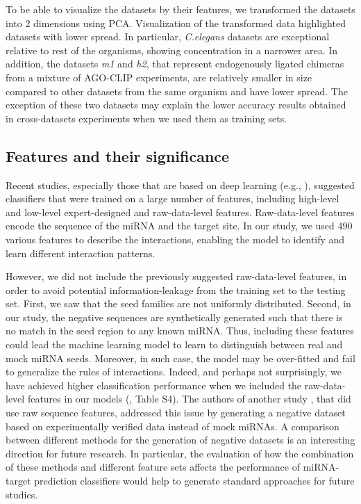 \documentclass{bmcart}
\begin{document}
To be able to visualize the datasets by their features, we transformed the datasets into 2 dimensions using PCA. Visualization of the transformed data highlighted datasets with lower spread. In particular, \textit{C.elegans} datasets are exceptional relative to rest of the organisms, showing concentration in a narrower area. In addition, the datasets \textit{m1} and \textit{h2}, that represent endogenously ligated chimeras from a mixture of AGO-CLIP experiments, are relatively smaller in size compared to other datasets from the same organism and have lower spread. The exception of these two datasets may explain the lower accuracy results obtained in cross-datasets experiments  when we used them as training sets.

\subsection*{Features and their significance}
Recent studies, especially those that are based on deep learning (e.g., \cite{wen2018deepmirtar}), suggested classifiers that were trained on a large number of features, including high-level and low-level expert-designed and raw-data-level features. Raw-data-level features encode the sequence of the miRNA and the target site. In our study, we used 490 various features to describe the interactions, enabling the model to identify and learn different interaction patterns. 

However, we did not include the previously suggested raw-data-level features, in order to avoid potential information-leakage from the training set to the testing set. First, we saw that the seed families are not uniformly distributed. Second, in our study, the negative sequences are synthetically generated such that there is no match in the seed region to any known miRNA. Thus, including these features could lead the machine learning model to learn to distinguish between real and mock miRNA seeds.  Moreover, in such case, the model may be over-fitted and fail to generalize the rules of interactions. Indeed, and perhaps not surprisingly, we have achieved higher classification performance when we included the raw-data-level features in our models (, Table S4). The authors of another study \cite{pla2018miraw}, that did use raw sequence features, addressed this issue by generating a negative dataset based on experimentally verified data instead of mock miRNAs. A comparison between different methods for the generation of negative datasets is an interesting direction for future research. In particular, the evaluation of how the combination of these methods and different feature sets affects the performance of miRNA-target prediction classifiers would help to generate standard approaches for future studies.
\end{document}
